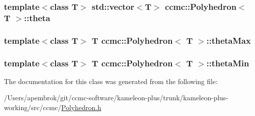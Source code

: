 \hypertarget{classccmc_1_1_polyhedron_ac590d3e84e9c6d413b6054de49ac3245}{
\subsubsection[{theta}]{\setlength{\rightskip}{0pt plus 5cm}template$<$class T$>$ std\-::vector$<$T$>$ {\bf ccmc\-::\-Polyhedron}$<$ T $>$\-::theta}}\label{classccmc_1_1_polyhedron_ac590d3e84e9c6d413b6054de49ac3245}
\hypertarget{classccmc_1_1_polyhedron_a4d7f2eaadb816292d2f8fa169f15599e}{
\subsubsection[{theta\-Max}]{\setlength{\rightskip}{0pt plus 5cm}template$<$class T$>$ T {\bf ccmc\-::\-Polyhedron}$<$ T $>$\-::theta\-Max}}\label{classccmc_1_1_polyhedron_a4d7f2eaadb816292d2f8fa169f15599e}
\hypertarget{classccmc_1_1_polyhedron_a6f7b5d5e06047d56e6ec6c01ce992041}{
\subsubsection[{theta\-Min}]{\setlength{\rightskip}{0pt plus 5cm}template$<$class T$>$ T {\bf ccmc\-::\-Polyhedron}$<$ T $>$\-::theta\-Min}}\label{classccmc_1_1_polyhedron_a6f7b5d5e06047d56e6ec6c01ce992041}


The documentation for this class was generated from the following file\-:\begin{DoxyCompactItemize}
\item 
/\-Users/apembrok/git/ccmc-\/software/kameleon-\/plus/trunk/kameleon-\/plus-\/working/src/ccmc/\hyperlink{_polyhedron_8h}{Polyhedron.\-h}\end{DoxyCompactItemize}
